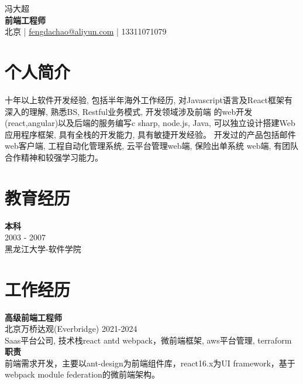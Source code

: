\documentclass[a4paper,9pt]{extarticle}
\begin{document}
\pagestyle{empty}

\begin{center}
冯大超\\[3pt] %
\textbf{前端工程师}\\[1pt] %
北京 | \href{mailto:fengdachao@aliyun.com}{fengdachao@aliyun.com} | 13311071079 %
\end{center}

\section*{个人简介}
\noindent
\newline
十年以上软件开发经验, 包括半年海外工作经历, 对Javascript语言及React框架有深入的理解, 熟悉BS, Restful业务模式, 开发领域涉及前端 的web开发(react,angular)以及后端的服务编写c sharp, node.js, Java, 可以独立设计搭建Web应用程序框架, 具有全栈的开发能力, 具有敏捷开发经验。 开发过的产品包括邮件web客户端, 工程自动化管理系统, 云平台管理web端, 保险出单系统 web端, 有团队合作精神和较强学习能力。\\


\section*{教育经历}
\noindent
\newline
\textbf{本科} \\
2003 - 2007 \\ 
黑龙江大学-软件学院 \\


\section*{工作经历}
\noindent
\newline

\noindent
\textbf{高级前端工程师} \\
北京万桥达观(Everbridge) 2021-2024 \\
Saas平台公司, 技术栈react antd webpack，微前端框架, aws平台管理, terraform \\
\textbf{职责} \\
前端需求开发，主要以ant-design为前端组件库，react16.x为UI framework，基于webpack module federation的微前端架构。 \\
\end{document}
